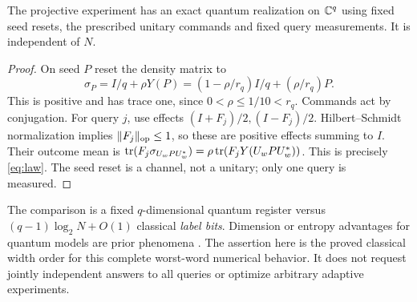 \begin{proposition}\label{prop:quantum}
The projective experiment has an exact quantum realization on $\mathbb C^q$
using fixed seed resets, the prescribed unitary commands and fixed
query measurements. It is independent of $N$.
\end{proposition}
\begin{proof}
On seed $P$ reset the density matrix to
\[
 \sigma_P=I/q+\rho Y(P)=(1-\rho/r_q)I/q+(\rho/r_q)P.
\]
This is positive and has trace one, since $0<\rho\le1/10<r_q$.
Commands act by conjugation. For query $j$, use effects
$(I+F_j)/2,(I-F_j)/2$. Hilbert--Schmidt normalization implies
$\lVert F_j\rVert_{\mathrm{op}}\le1$, so these are positive effects summing
to $I$. Their outcome mean is
$\operatorname{tr}(F_j\sigma_{U_wPU_w^*})=\rho\operatorname{tr}(F_jY(U_wPU_w^*))$.
This is precisely \eqref{eq:law}. The seed reset is a channel, not a
unitary; only one query is measured.
\end{proof}
The comparison is a fixed $q$-dimensional quantum register versus
$(q-1)\log_2N+O(1)$ classical \emph{label bits}. Dimension or entropy
advantages for quantum models are prior phenomena \cite{Gu,Thompson,Ghafari}.
The assertion here is the proved classical width order for this complete
worst-word numerical behavior. It does not request jointly independent
answers to all queries or optimize arbitrary adaptive experiments.
